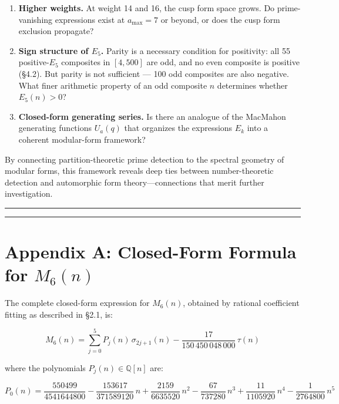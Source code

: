 \documentclass[
  11pt,
]{article}
\begin{document}
\begin{enumerate}
\def\labelenumi{\arabic{enumi}.}
\item
  \textbf{Higher weights.} At weight 14 and 16, the cusp form space
  grows. Do prime-vanishing expressions exist at \(a_{\max} = 7\) or
  beyond, or does the cusp form exclusion propagate?
\item
  \textbf{Sign structure of \(E_5\).} Parity is a necessary condition
  for positivity: all 55 positive-\(E_5\) composites in \([4,500]\) are
  odd, and no even composite is positive (§4.2). But parity is not
  sufficient --- 100 odd composites are also negative. What finer
  arithmetic property of an odd composite \(n\) determines whether
  \(E_5(n) > 0\)?
\item
  \textbf{Closed-form generating series.} Is there an analogue of the
  MacMahon generating functions \(U_a(q)\) that organizes the
  expressions \(E_k\) into a coherent modular-form framework?
\end{enumerate}

By connecting partition-theoretic prime detection to the spectral
geometry of modular forms, this framework reveals deep ties between
number-theoretic detection and automorphic form theory---connections
that merit further investigation.

\begin{center}\rule{0.5\linewidth}{0.5pt}\end{center}

\begin{center}\rule{0.5\linewidth}{0.5pt}\end{center}

\section{\texorpdfstring{Appendix A: Closed-Form Formula for
\(M_6(n)\)}{Appendix A: Closed-Form Formula for M\_6(n)}}\label{appendix-a-closed-form-formula-for-m_6n}

The complete closed-form expression for \(M_6(n)\), obtained by rational
coefficient fitting as described in §2.1, is:

\[M_6(n) = \sum_{j=0}^{5} P_j(n)\,\sigma_{2j+1}(n) - \frac{17}{150\,450\,048\,000}\,\tau(n)\]

where the polynomials \(P_j(n) \in \mathbb{Q}[n]\) are:

\[P_0(n) = \frac{550499}{4541644800} - \frac{153617}{371589120}\,n + \frac{2159}{6635520}\,n^2 - \frac{67}{737280}\,n^3 + \frac{11}{1105920}\,n^4 - \frac{1}{2764800}\,n^5\]
\end{document}
